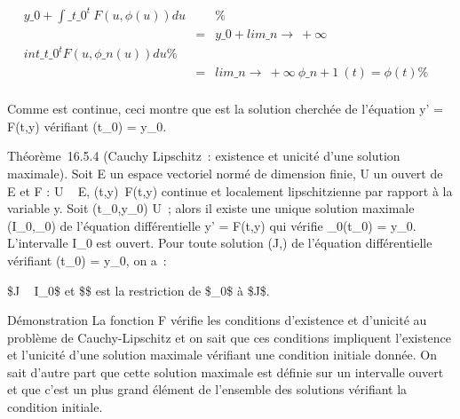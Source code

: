 \documentclass[]{article}
\begin{document}
\begin{align*} y\_0
+\int  \_t\_0^t~F(u,\phi(u))
du&& \%& \\ & =& y\_0
+ lim\_n\rightarrow~+\infty~~\\int
 \_t\_0^tF(u,\phi\_ n(u)) du\%&
\\ & =&
lim\_n\rightarrow~+\infty~\phi\_n+1~(t) = \phi(t) \%&
\\ \end{align*}

Comme \phi est continue, ceci montre que \phi est la solution cherchée de
l'équation y' = F(t,y) vérifiant \phi(t\_0) = y\_0.

Théorème~16.5.4 (Cauchy Lipschitz~: existence et unicité d'une solution
maximale). Soit E un espace vectoriel normé de dimension finie, U un
ouvert de ~ \times E et F : U \rightarrow~ E, (t,y)\mapsto~F(t,y)
continue et localement lipschitzienne par rapport à la variable y. Soit
(t\_0,y\_0) \in U~; alors il existe une unique solution
maximale (I\_0,\phi\_0) de l'équation différentielle y' =
F(t,y) qui vérifie \phi\_0(t\_0) = y\_0.
L'intervalle I\_0 est ouvert. Pour toute solution (J,\psi) de
l'équation différentielle vérifiant \psi(t\_0) = y\_0, on
a~:

\text\$J \subset~ I\_0\$ et \$\psi\$ est la restriction
de \$\phi\_0\$ à \$J\$.

Démonstration La fonction F vérifie les conditions d'existence et
d'unicité au problème de Cauchy-Lipschitz et on sait que ces conditions
impliquent l'existence et l'unicité d'une solution maximale vérifiant
une condition initiale donnée. On sait d'autre part que cette solution
maximale est définie sur un intervalle ouvert et que c'est un plus grand
élément de l'ensemble des solutions vérifiant la condition initiale.
\end{document}

